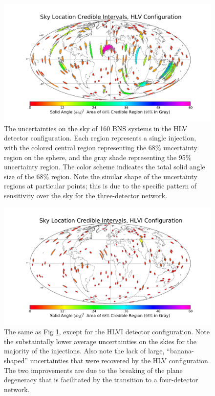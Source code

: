 \documentclass[11pt,a4paper]{emulateapj} 
\begin{document}
\begin{figure}[ht!]
  \centering \includegraphics[angle=0,scale=0.4, trim=5cm 2cm 3cm
    0cm]{HLVsky.pdf}
 \caption{The uncertainties on the sky of 160 BNS systems in the HLV
   detector configuration.  Each region represents a single injection,
   with the colored central region representing the 68\% uncertainty
   region on the sphere, and the gray shade representing the 95\%
   uncertainty region.  The color scheme indicates the total solid
   angle size of the 68\% region.  Note the similar shape of the
   uncertainty regions at particular points; this is due to the
   specific pattern of sensitivity over the sky for the three-detector network.}
 \label{2525SkyLocHLV}
\end{figure}

\begin{figure}[ht!]
  \centering \includegraphics[angle=0,scale=0.4, trim=5cm 2cm 3cm
    0cm]{HLVIsky.pdf}
 \caption{The same as Fig \ref{2525SkyLocHLV}, except for the HLVI
   detector configuration.  Note the substaintally lower average
   uncertainties on the skies for the majority of the injections.
   Also note the lack of large, ``banana-shaped'' uncertainties that
   were recovered by the HLV configuration.  The two improvements are
   due to the breaking of the plane degeneracy that
   is facilitated by the transition to a four-detector network.}
 \label{2525SkyLocHLVI}
\end{figure}
  
\end{document}
